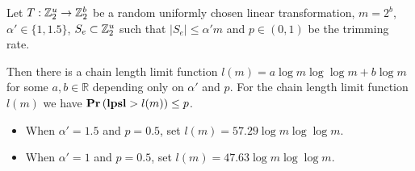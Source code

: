 \begin{theorem}
\label{theorem-model-chain-limit-rule}
Let $T: \mathbb{Z}_{2}^{u} \rightarrow \mathbb{Z}_{2}^{b}$ be a random uniformly chosen linear transformation, $m = 2 ^ b$, $\alpha' \in \{1, 1.5\}$, $S_e \subset \mathbb{Z}_{2}^{u}$ such that $|S_e| \leq \alpha' m$ and $p \in (0, 1)$ be the trimming rate.

Then there is a chain length limit function $l(m) = a \log m \log \log m + b \log m$ for some $a, b \in \mathbb{R}$ depending only on $\alpha'$ and $p$. For the chain length limit function $l(m)$ we have $\mathbf{Pr}\left(\mathbf{lpsl} > l(m)\right) \leq p$.

\begin{itemize}
\item When $\alpha' = 1.5$ and $p = 0.5$, set $l(m) = 57.29 \log m \log \log m$.
\item When $\alpha' = 1$ and $p = 0.5$, set $l(m) = 47.63 \log m \log \log m$.
\end{itemize}
\end{theorem}
